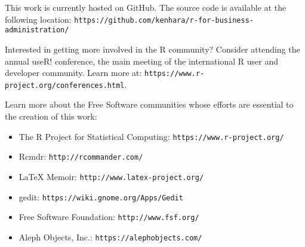 %
%
%
%
%

\setlength{\parindent}{0pt}
This work is currently hosted on GitHub. The source code is available at the following location: \texttt{https://github.com/kenhara/r-for-business-administration/}

Interested in getting more involved in the R community? Consider attending the annual useR! conference, the main meeting of the international R user and developer community. Learn more at: \texttt{https://www.r-project.org/conferences.html}.

Learn more about the Free Software communities whose efforts are essential to the creation of this work:

\begin{itemize}
 \item The R Project for Statistical Computing: \texttt{https://www.r-project.org/}
 \item Rcmdr: \texttt{http://rcommander.com/}
 \item {\LaTeX} Memoir: \texttt{http://www.latex-project.org/}
 \item gedit: \texttt{https://wiki.gnome.org/Apps/Gedit}
 \item Free Software Foundation: \texttt{http://www.fsf.org/}
 \item Aleph Objects, Inc.: \texttt{https://alephobjects.com/}
\end{itemize}
